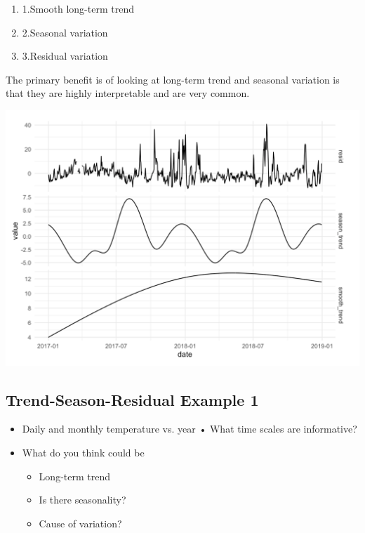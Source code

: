 \documentclass[11pt]{article}
\theoremstyle{definition}
\begin{document}
\begin{enumerate}
  \item 1.Smooth long-term trend
  \item 2.Seasonal variation
  \item 3.Residual variation
\end{enumerate}

The primary benefit is of
looking at long-term trend
and seasonal variation is that
they are highly interpretable
and are very common.

\includegraphics[width=\textwidth]{2.png}

\subsection{Trend-Season-Residual Example 1}
\begin{itemize}
  \item Daily and monthly
  temperature vs. year
  • What time scales are
  informative?
  \item What do you think
  could be
  \begin{itemize}
    \item Long-term trend
    \item Is there seasonality?
    \item Cause of variation?
  \end{itemize}
\end{itemize}
\end{document}
